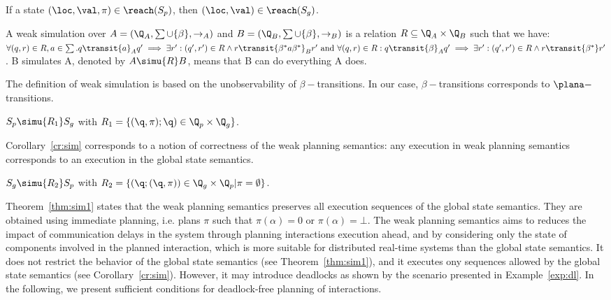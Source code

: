 \begin{corollary}\label{cr:reach}
  If a state $(\loc,\val,\pi)\in\reach(S_p)$, then $(\loc,\val)\in\reach(S_g)$.
\end{corollary}

\begin{definition}
  A weak simulation over $A=(\Q_A,\sum\cup\{\beta\},\to_A)$ and $B=(\Q_B,\sum\cup\{\beta\},
  \to_B)$ is a relation $R\subseteq \Q_A\times \Q_B$ such that we have: 
  $\forall(q,r)\in R, a\in \sum .q\transit{a}_A q' \implies\exists r':(q',r')\in R\wedge r\transit{
  \beta^*a\beta^*}_B r' \text{ and } \forall(q,r)\in R: q\transit{\beta}_Aq'\implies\exists r':
  (q',r')\in R\wedge r\transit{\beta^*}r'$.
  B simulates A, denoted by $A\simu{R}B$, means that B can do everything A does.
\end{definition}
The definition of weak simulation is based on the unobservability of $\beta-$transitions. In our case, $\beta-$transitions corresponds to $\plana-$transitions.
\begin{corollary}\label{cr:sim}
  $S_p\simu{R_1} S_g$ with $R_1=\{(\q,\pi);\q)\in\Q_p\times\Q_g\}$.
\end{corollary}

Corollary~\ref{cr:sim} corresponds to a notion of correctness of the weak planning semantics: any execution in weak planning semantics corresponds to an execution in the global state semantics.

\begin{theorem}
  \label{thm:sim1}
  $S_g\simu{R_2} S_p$ with $R_2=\{(\q;(\q,\pi))\in\Q_g\times\Q_p| \pi=\emptyset\}$. 
\end{theorem}

Theorem~\ref{thm:sim1} states that the weak planning semantics preserves all execution sequences of the global state semantics.
They are obtained using immediate planning, i.e. plans $\pi$ such that $\pi(\alpha) = 0$ or $\pi(\alpha) = \bot$.
The weak planning semantics aims to reduces the impact of communication delays in the system through planning interactions execution ahead, and by
considering only the state of components involved in the planned interaction, which is more suitable for 
distributed real-time systems than the global state semantics.
It does not restrict the behavior of the global state semantics (see Theorem~\ref{thm:sim1}), and it executes ony sequences allowed by the global state semantics (see Corollary~\ref{cr:sim}).
However, it may introduce deadlocks as shown by the scenario presented in Example~\ref{exp:dl}.
In the following, we present sufficient conditions for deadlock-free 
planning of interactions.

